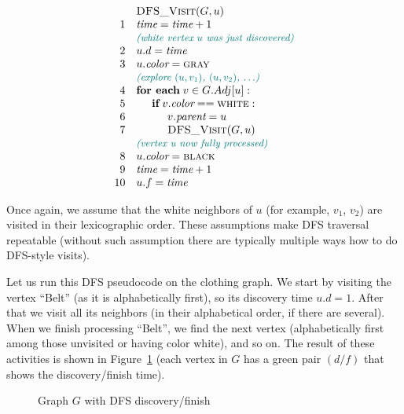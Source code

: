 \documentclass[a4paper,12pt]{article}
\begin{document}
$$\begin{array}{rl}
  & \text{\sc DFS\textunderscore{}Visit}(G,u)\\
1 & \text{\em time} = \text{\em time} + 1 \\
  & \textcolor{teal}{\small \text{\em (white vertex $u$ was just discovered)}}\\
2 & u.d = \text{\em time}\\
3 & u.\text{\em color} = \text{\sc gray}\\
  & \textcolor{teal}{\small \text{\em (explore $(u,v_1)$, $(u,v_2)$, $\ldots$)}}\\
4 & \text{\bf for each}\;v \in G.Adj[u]: \\ 
5 & \hspace{0.5cm} \text{\bf if}\;v.\text{\em color} == \text{\sc white}:\\
6 & \hspace{1cm} v.\text{\em parent} = u\\
7 & \hspace{1cm} \text{\sc DFS\textunderscore{}Visit}(G,u)\\
  & \textcolor{teal}{\small \text{\em (vertex u now fully processed)}}\\
8 & u.\text{\em color} = \text{\sc black}\\
9 & \text{\em time} = \text{\em time} + 1\\
10 & u.f = \text{\em time}\\
\end{array}$$


Once again, we assume that the white neighbors of $u$ (for example, 
$v_1$, $v_2$) are visited in their lexicographic order. 
These assumptions make DFS traversal repeatable (without such assumption there 
are typically multiple ways how to do DFS-style visits). 

Let us run this DFS pseudocode on the clothing graph. 
We start by visiting the vertex ``Belt'' (as it is alphabetically first), 
so its discovery time $u.d = 1$. After that we visit all its neighbors (in their 
alphabetical order, if there are several). 
When we finish processing ``Belt'', we find the next vertex
(alphabetically first among those unvisited or having color {\sc white}), and so on. 
The result of these activities is shown in Figure~\ref{fig:clothing-dfs}
(each vertex in $G$ has a green pair $(d/f)$ that shows the discovery/finish 
time). 

\begin{figure}[!htb]
\caption{\label{fig:clothing-dfs} Graph $G$ with DFS discovery/finish}
\end{figure}
\end{document}
